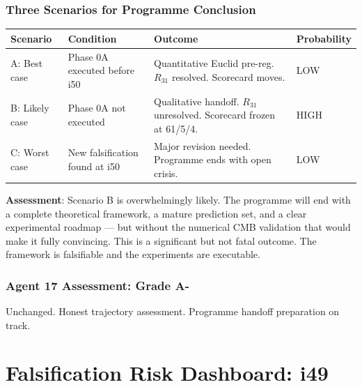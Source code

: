 \documentclass[11pt,a4paper]{article}
\begin{document}
\section{Three Scenarios for Programme Conclusion}

\begin{center}
\begin{tabular}{lp{4cm}p{4cm}l}
\toprule
\textbf{Scenario} & \textbf{Condition} & \textbf{Outcome} & \textbf{Probability} \\
\midrule
A: Best case & Phase 0A executed before i50 & Quantitative Euclid pre-reg. $R_{31}$ resolved. Scorecard moves. & LOW \\
B: Likely case & Phase 0A not executed & Qualitative handoff. $R_{31}$ unresolved. Scorecard frozen at 61/5/4. & HIGH \\
C: Worst case & New falsification found at i50 & Major revision needed. Programme ends with open crisis. & LOW \\
\bottomrule
\end{tabular}
\end{center}

\textbf{Assessment}: Scenario B is overwhelmingly likely. The programme will end with a complete theoretical framework, a mature prediction set, and a clear experimental roadmap --- but without the numerical CMB validation that would make it fully convincing. This is a significant but not fatal outcome. The framework is falsifiable and the experiments are executable.

\section{Agent 17 Assessment: Grade A-}

Unchanged. Honest trajectory assessment. Programme handoff preparation on track.


\part{Falsification Risk Dashboard: i49}
\label{part:risk}
\end{document}
